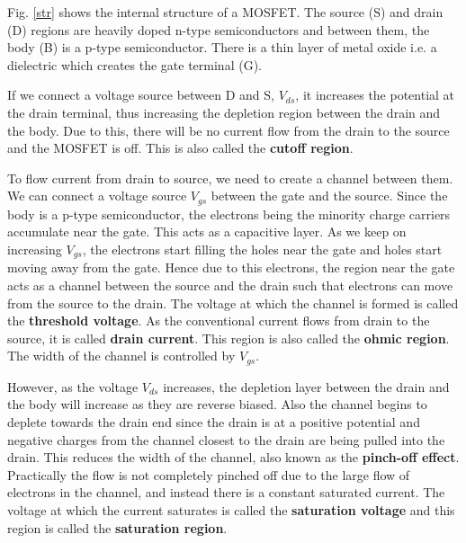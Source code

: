 Fig. \ref{str} shows the internal structure of a MOSFET. The source (S) and drain (D) regions are heavily doped n-type semiconductors and between them, the body (B) is a p-type semiconductor. There is a thin layer of metal oxide i.e. a dielectric which creates the gate terminal (G).

If we connect a voltage source between D and S, $V_{ds}$, it increases the potential at the drain terminal, thus increasing the depletion region between the drain and the body. Due to this, there will be no current flow from the drain to the source and the MOSFET is off. This is also called the \textbf{cutoff region}.

To flow current from drain to source, we need to create a channel between them. We can connect a voltage source $V_{gs}$ between the gate and the source. Since the body is a p-type semiconductor, the electrons being the minority charge carriers accumulate near the gate. This acts as a capacitive layer. As we keep on increasing $V_{gs}$, the electrons start filling the holes near the gate and holes start moving away from the gate. Hence due to this electrons, the region near the gate acts as a channel between the source and the drain such that electrons can move from the source to the drain. The voltage at which the channel is formed is called the \textbf{threshold voltage}. As the conventional current flows from drain to the source, it is called \textbf{drain current}. This region is also called the \textbf{ohmic region}. The width of the channel is controlled by $V_{gs}$.

However, as the voltage $V_{ds}$ increases, the depletion layer between the drain and the body will increase as they are reverse biased. Also the channel begins to deplete towards the drain end since the drain is at a positive potential and negative charges from the channel closest to the drain are being pulled into the drain. This reduces the width of the channel, also known as the \textbf{pinch-off effect}. Practically the flow is not completely pinched off due to the large flow of electrons in the channel, and instead there is a constant saturated current. The voltage at which the current saturates is called the \textbf{saturation voltage} and this region is called the \textbf{saturation region}.

